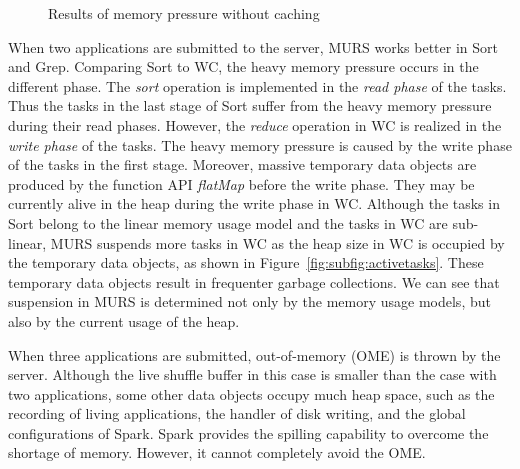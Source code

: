 \begin{figure*}[!t]
\centering
{}
\vspace*{-4mm}
\caption{Results of memory pressure without caching}
\vspace*{-4mm}
\label{fig:pressurewithoutcache}
\end{figure*}

When two applications are submitted to the server, MURS works better in Sort and Grep. Comparing Sort to WC, the heavy memory pressure occurs in the different phase. The \textit{sort} operation is implemented in the \textit{read phase} of the tasks. Thus the tasks in the last stage of Sort suffer from the heavy memory pressure during their read phases. However, the \textit{reduce} operation in WC is realized in the \textit{write phase} of the tasks. The heavy memory pressure is caused by the write phase of the tasks in the first stage. Moreover, massive temporary data objects are produced by the function API \textit{flatMap} before the write phase. They may be currently alive in the heap during the write phase in WC. Although the tasks in Sort belong to the linear memory usage model and the tasks in WC are sub-linear, MURS suspends more tasks in WC as the heap size in WC is occupied by the temporary data objects, as shown in Figure~\ref{fig:subfig:activetasks}. These temporary data objects result in frequenter garbage collections. We can see that suspension in MURS is determined not only by the memory usage models, but also by the current usage of the heap. 

When three applications are submitted, out-of-memory (OME) is thrown by the server. Although the live shuffle buffer in this case is smaller than the case with two applications, some other data objects occupy much heap space, such as the recording of living applications, the handler of disk writing, and the global configurations of Spark. Spark provides the spilling capability to overcome the shortage of memory. However, it cannot completely avoid the OME.

